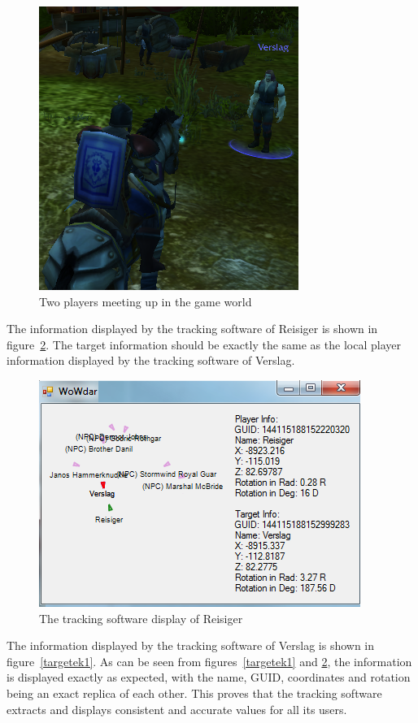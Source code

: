 \begin{figure}[htbp]
\centering
\includegraphics[scale = 0.75]{ektarget2.png}	
\caption{Two players meeting up in the game world}
\label{ektarget2}
\end{figure}

The information displayed by the tracking software of Reisiger is shown in figure~\ref{ektarget1}. The target information should be exactly the same as the local player information displayed by the tracking software of Verslag.

\begin{figure}[htbp]
\centering
\includegraphics[scale = 0.8]{ektarget1.png}	
\caption{The tracking software display of Reisiger}
\label{ektarget1}
\end{figure}

The information displayed by the tracking software of Verslag is shown in figure~\ref{targetek1}. As can be seen from figures~\ref{targetek1} and \ref{ektarget1}, the information is displayed exactly as expected, with the name, GUID, coordinates and rotation being an exact replica of each other. This proves that the tracking software extracts and displays consistent and accurate values for all its users.

